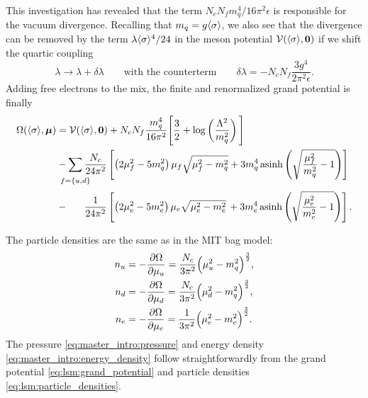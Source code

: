 This investigation has revealed that the term $N_c N_f m_q^4 / 16 \pi^2 \epsilon$ is responsible for the vacuum divergence.
Recalling that $m_q=g \langle \sigma \rangle$,
we also see that the divergence can be removed by the term $\lambda \langle \sigma \rangle^4 / 24$ in the meson potential $\mathcal{V}(\langle \sigma \rangle,{\bm{0}})$
if we shift the quartic coupling
\begin{equation}
	\lambda \rightarrow \lambda + \delta\lambda
	\qquad \text{with the counterterm} \qquad
	\delta\lambda = -N_c N_f \frac{3 g^4}{2 \pi^2 \epsilon} .
\end{equation}
Adding free electrons to the mix, the finite and renormalized grand potential is finally
\begin{equation}
\begin{split}
	\Omega(\avg{\sigma},\vec{\mu}) &= \pot(\avg{\sigma},\vec{0}) + N_c N_f \frac{m_q^4}{16 \pi^2} \Bigg[ \frac{3}{2} + \log\left(\frac{{\Lambda}^2}{m_q^2}\right) \Bigg] \\
	                               &-\smashoperator{\sum_{\vphantom{\big|} f=\{u,d\}}} \frac{N_c}{24 \pi^2} \left[ \left( 2 \mu_f^2 - 5 m_q^2 \right) \mu_f \sqrt{\mu_f^2 - m_q^2} + 3 m_q^4 \asinh \left( \sqrt{\frac{\mu_{\smash{f}}^2}{m_q^2}-1} \right) \right] \\
	                               &-\phantom{\sum} \, \frac{1}{24 \pi^2} \left[ \left( 2 \mu_e^2 - 5 m_e^2 \right) \mu_e \sqrt{\mu_e^2 - m_e^2} \, + 3 m_e^4 \asinh \left( \sqrt{\frac{\mu_{\smash{e}}^2}{m_e^2}-1} \right) \right].
\end{split}
\label{eq:lsm:grand_potential}
\end{equation}

The particle densities are the same as in the MIT bag model:
\begin{subequations}
\begin{align}
	n_u &= -\pdv{\Omega}{\mu_u} = \frac{N_c}{3 \pi^2} \Big( \mu_u^2 - m_q^2 \Big)^{\frac32}, \\
	n_d &= -\pdv{\Omega}{\mu_d} = \frac{N_c}{3 \pi^2} \Big( \mu_d^2 - m_q^2 \Big)^{\frac32}, \\
	n_e &= -\pdv{\Omega}{\mu_e} = \frac{  1}{3 \pi^2} \Big( \mu_e^2 - m_e^2 \Big)^{\frac32}.
\end{align}%
\label{eq:lsm:particle_densities}%
\end{subequations}%
The pressure \eqref{eq:master_intro:pressure} and energy density \eqref{eq:master_intro:energy_density} follow straightforwardly from the grand potential \eqref{eq:lsm:grand_potential} and particle densities \eqref{eq:lsm:particle_densities}.

